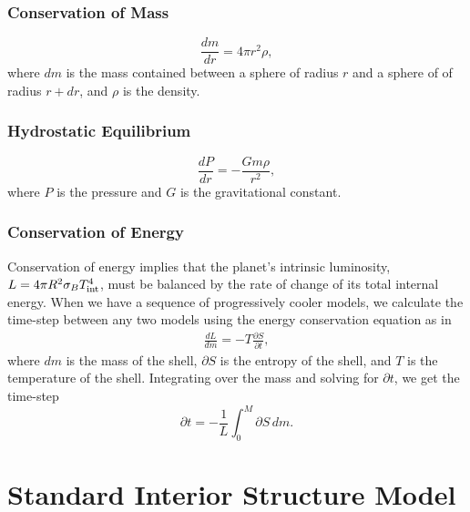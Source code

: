\documentclass[11pt]{ucscthesisbs}
\begin{document}
\subsubsection{Conservation of Mass}
\begin{equation}
  \frac{dm}{dr} =4 \pi r^{2}\rho  ,
\end{equation}
where $dm$ is the mass contained between a sphere of radius $r$ and a sphere of of radius $r + dr$, and $\rho$ is the density. 
\subsubsection{Hydrostatic Equilibrium}
\begin{equation}
  \frac{dP}{dr} = -\frac{Gm\rho}{r^{2}}  ,
\end{equation}
where $P$ is the pressure and $G$ is the gravitational constant. 
\subsubsection{Conservation of Energy}
Conservation of energy implies that the planet's intrinsic luminosity, $L = 4\pi R^2\sigma_{B}T_{\rm int}^4$, 
must be balanced by the rate of change of its total internal energy. When we have a sequence of progressively cooler models, we calculate the time-step between any two models using the energy conservation equation as in \citep{fortney_2011}
\begin{align}
\frac{dL}{dm}= -T\frac{\partial S}{\partial t},
\label{eq:energy_conservation}
\end{align}
where $dm$ is the mass of the shell, $\partial S$ is the entropy of the shell, and $T$ is the temperature of the shell. Integrating over the mass and solving for $\partial t$, we get the time-step
\begin{equation}
\partial t = -\frac{1}{L} \int_{0}^{M} \partial S \,dm .
\label{eq:timestep}
\end{equation}

\section{Standard Interior Structure Model}
\end{document}
